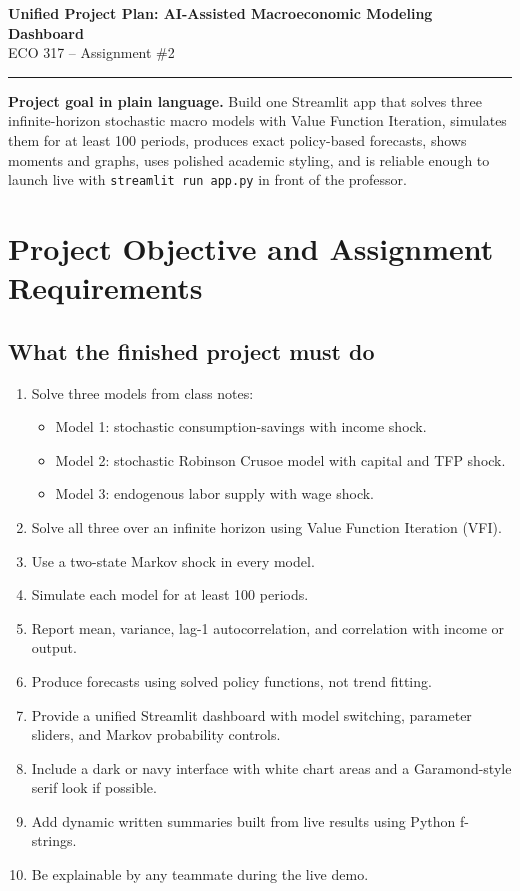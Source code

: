\documentclass[11pt]{article}
\begin{document}
\begin{center}
    {\LARGE \textbf{Unified Project Plan: AI-Assisted Macroeconomic Modeling Dashboard}}\\[0.4em]
    {\large ECO 317 -- Assignment \#2}\\[0.4em]
    \rule{0.9\linewidth}{0.5pt}
\end{center}

\begin{goalbox}
\textbf{Project goal in plain language.} Build one Streamlit app that solves three infinite-horizon stochastic macro models with Value Function Iteration, simulates them for at least 100 periods, produces exact policy-based forecasts, shows moments and graphs, uses polished academic styling, and is reliable enough to launch live with \texttt{streamlit run app.py} in front of the professor.
\end{goalbox}

\section{Project Objective and Assignment Requirements}

\subsection{What the finished project must do}
\begin{enumerate}[label=\textbf{\arabic*.}]
    \item Solve three models from class notes:
    \begin{itemize}
        \item Model 1: stochastic consumption-savings with income shock.
        \item Model 2: stochastic Robinson Crusoe model with capital and TFP shock.
        \item Model 3: endogenous labor supply with wage shock.
    \end{itemize}
    \item Solve all three over an infinite horizon using Value Function Iteration (VFI).
    \item Use a two-state Markov shock in every model.
    \item Simulate each model for at least 100 periods.
    \item Report mean, variance, lag-1 autocorrelation, and correlation with income or output.
    \item Produce forecasts using solved policy functions, not trend fitting.
    \item Provide a unified Streamlit dashboard with model switching, parameter sliders, and Markov probability controls.
    \item Include a dark or navy interface with white chart areas and a Garamond-style serif look if possible.
    \item Add dynamic written summaries built from live results using Python f-strings.
    \item Be explainable by any teammate during the live demo.
\end{enumerate}
\end{document}

